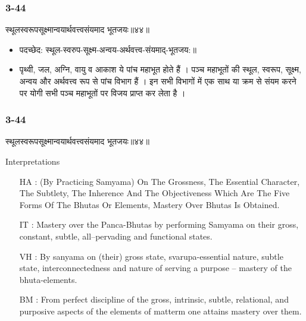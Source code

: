 \begin{frame}[fragile]\frametitle{3-44}
\begin{sanskrit}
स्थूलस्वरूपसूक्ष्मान्वयार्थवत्त्वसंयमाद भूतजयः॥४४॥
\end{sanskrit}

\begin{itemize}
\item पदच्छेद:  स्थूल-स्वरुप-सूक्ष्म-अन्वय-अर्थवत्त्व-‌संयमाद्-भूतजय:॥
\item पृथ्वी, जल, अग्नि, वायु व आकाश ये पांच महाभूत होते हैं । पञ्च महाभूतों की स्थूल, स्वरूप, सूक्ष्म, अन्वय और अर्थवत्त्व रूप से पांच विभाग हैं । इन सभी विभागों में एक साथ या क्रम से संयम करने पर योगी सभी पञ्च महाभूतों पर विजय प्राप्त कर लेता है ।
\end{itemize}
\end{frame}

\begin{frame}[fragile]\frametitle{3-44}
\begin{sanskrit}
स्थूलस्वरूपसूक्ष्मान्वयार्थवत्त्वसंयमाद भूतजयः॥४४॥
\end{sanskrit}

Interpretations
\begin{itemize}	
\item [HA]: (By Practicing Samyama) On The Grossness, The Essential Character, The Subtlety, The Inherence And The Objectiveness Which Are The Five Forms Of The Bhutas Or Elements, Mastery Over Bhutas Is Obtained.		
\item [IT]: Mastery over the Panca-Bhutas by performing Samyama on their gross, constant, subtle, all–pervading and functional states.
\item [VH]: By sanyama on (their) gross state, svarupa-essential nature, subtle state, interconnectedness and nature of serving a purpose – mastery of the bhuta-elements.
\item [BM]: From perfect discipline of the gross, intrinsic, subtle, relational, and purposive aspects of the elements of matterm one attains mastery over them.
\end{itemize}
\end{frame}

